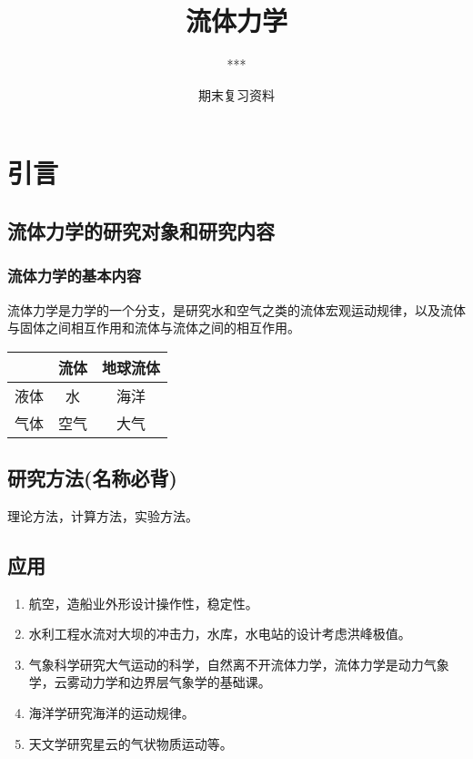 \documentclass[a4paper,oneside]{ctexbook}
\title{流体力学}
\author{***}
\date{期末复习资料}
\begin{document}
\frontmatter 

\maketitle

\chapter*{引言}

\section*{流体力学的研究对象和研究内容}


\subsection*{流体力学的基本内容}

流体力学是力学的一个分支，是研究水和空气之类的流体宏观运动规律，以及流体与固体之间相互作用和流体与流体之间的相互作用。
\begin{center}
    \begin{tabular}{|c|c|c|}
        \hline
        &流体 & 地球流体\\
        \hline
        液体 & 水 & 海洋\\
        \hline
        气体 & 空气 & 大气\\
        \hline
    \end{tabular}
\end{center}

\section*{研究方法(名称必背)}

理论方法，计算方法，实验方法。

\section*{应用}
\begin{enumerate}
    \item 航空，造船业外形设计操作性，稳定性。
    \item 水利工程水流对大坝的冲击力，水库，水电站的设计考虑洪峰极值。
    \item 气象科学研究大气运动的科学，自然离不开流体力学，流体力学是动力气象学，云雾动力学和边界层气象学的基础课。
    \item 海洋学研究海洋的运动规律。
    \item 天文学研究星云的气状物质运动等。
\end{enumerate} 
\end{document}
